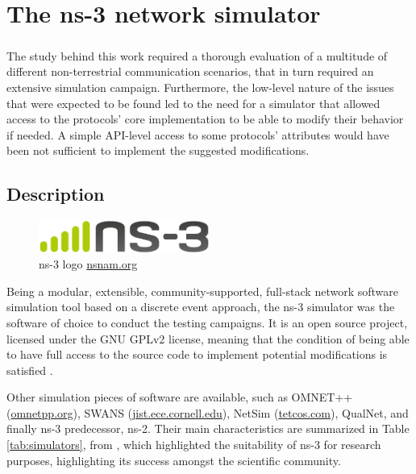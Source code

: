 
\chapter{The ns-3 network simulator}
\label{chp:ns3}

\paragraph{}
The study behind this work required a thorough evaluation of a multitude of different non-terrestrial communication scenarios, that in turn required an extensive simulation campaign. Furthermore, the low-level nature of the issues that were expected to be found led to the need for a simulator that allowed access to the protocols' core implementation to be able to modify their behavior if needed. A simple API-level access to some protocols' attributes would have been not sufficient to implement the suggested modifications.

\section{Description}
\label{sec:ns3_desc}

\begin{figure}[ht]
    \centering
    \includegraphics[width=0.5\textwidth]{res/ns-3-notext.png}
    \caption{ns-3 logo \href{https://www.nsnam.org/}{nsnam.org}}
    \label{fig:ns3-logo}
\end{figure}

Being a modular, extensible, community-supported, full-stack network software simulation tool based on a discrete event approach, the ns-3 simulator was the software of choice to conduct the testing campaigns. It is an open source project, licensed under the GNU GPLv2 license, meaning that the condition of being able to have full access to the source code to implement potential modifications is satisfied \cite{ns3-website}.

Other simulation pieces of software are available, such as OMNET++ (\href{https://omnetpp.org/}{omnetpp.org}), SWANS (\href{http://jist.ece.cornell.edu/}{jist.ece.cornell.edu}), NetSim (\href{https://www.tetcos.com/}{tetcos.com}), QualNet, and finally ns-3 predecessor, ns-2. Their main characteristics are summarized in Table \ref{tab:simulators}, from \cite{review-ns3}, which highlighted the suitability of ns-3 for research purposes, highlighting its success amongst the scientific community.

